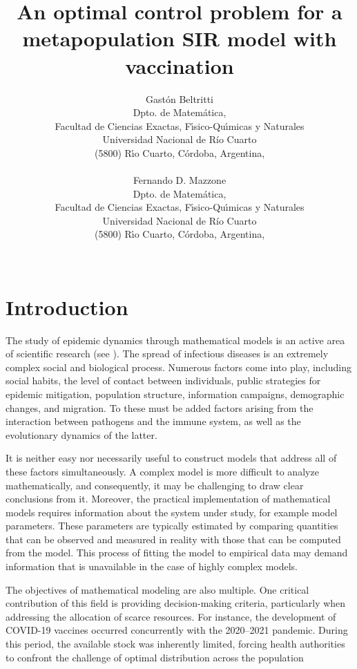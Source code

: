 \documentclass[a4paper,10pt]{article}
\title{An optimal control problem for a metapopulation SIR model with vaccination}
\author{Gastón Beltritti \\
Dpto. de Matem\'atica,\\ Facultad de Ciencias Exactas, F\'{\i}sico-Qu\'{\i}micas y Naturales\\
Universidad Nacional de R\'{i}o Cuarto\\
(5800) R\'{\i}o Cuarto, C\'ordoba, Argentina,\\
 \\
  Fernando D. Mazzone  \\
Dpto. de Matem\'atica,\\ Facultad de Ciencias Exactas, F\'{\i}sico-Qu\'{\i}micas y Naturales\\
Universidad Nacional de R\'{i}o Cuarto\\
(5800) R\'{\i}o Cuarto, C\'ordoba, Argentina,\\
 \\
}
\theoremstyle{remark}
\begin{document}
\date{}
\maketitle


\begin{abstract}

\end{abstract}


\section{Introduction}
 

The study of epidemic dynamics through mathematical models is an active area of scientific research (see \cite{LindaS.Allen486,FredBrauer478,FredBrauer479,MaiaMartcheva480,FredBrauer482}). The spread of infectious diseases is an extremely complex social and biological process. Numerous factors come into play, including social habits, the level of contact between individuals, public strategies for epidemic mitigation, population structure, information campaigns, demographic changes, and migration. To these must be added factors arising from the interaction between pathogens and the immune system, as well as the evolutionary dynamics of the latter.

It is neither easy nor necessarily useful to construct models that address all of these factors simultaneously. A complex model is more difficult to analyze mathematically, and consequently, it may be challenging to draw clear conclusions from it. Moreover, the practical implementation of mathematical models requires information about the system under study, for example model parameters. These parameters are typically estimated by comparing quantities that can be observed and measured in reality with those that can be computed from the model. This process of fitting the model to empirical data may demand information that is unavailable  in the case of highly complex models.

The objectives of mathematical modeling are also multiple. One critical contribution of this field is providing decision-making criteria, particularly when addressing the allocation of scarce resources. For instance, the development of COVID-19 vaccines occurred concurrently with the 2020–2021 pandemic. During this period, the available stock was inherently limited, forcing health authorities to confront the challenge of optimal distribution across the population
\end{document}
